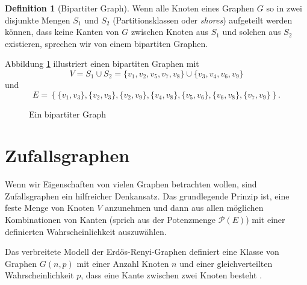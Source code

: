 \documentclass[11pt]{scrreprt} %
\theoremstyle{definition}
\newtheorem{definition}{Definition}
\begin{document}
\begin{definition}[Bipartiter Graph]
Wenn alle Knoten eines Graphen $G$ so in zwei disjunkte Mengen $S_1$ und $S_2$ (Partitionsklassen oder {\sl shores}) aufgeteilt werden können, dass keine Kanten von $G$ zwischen Knoten aus $S_1$ und solchen aus $S_2$ existieren, sprechen wir von einem bipartiten Graphen.
\end{definition}

Abbildung \ref{bipartGraph} illustriert einen bipartiten Graphen mit
\[
	V = S_1 \cup S_2 = \{v_1,v_2,v_5,v_7,v_8\} \cup \{ v_3,v_4,v_6,v_9 \}
\]
und
\[
	E = \left\{  \{v_1,v_3\}, \{v_2,v_3\}, \{v_2,v_9\}, \{v_4,v_8\}, \{v_5,v_6\}, \{ v_6,v_8 \}, \{ v_7,v_9 \}  \right\}.
\]

\begin{figure}
\caption{Ein bipartiter Graph}
\label{bipartGraph}
\begin{center}


\end{center}
\end{figure}

\section{Zufallsgraphen}

Wenn wir Eigenschaften von vielen Graphen betrachten wollen, sind Zufallsgraphen ein hilfreicher Denkansatz. Das grundlegende Prinzip ist, eine feste Menge von Knoten $V$ anzunehmen und dann aus allen möglichen Kombinationen von Kanten (sprich aus der Potenzmenge $\mathcal{P}(E)$) mit einer definierten Wahrscheinlichkeit auszuwählen.

\bigskip
Das verbreitete Modell der Erdös-Renyi-Graphen definiert eine Klasse von Graphen $G(n, p)$ mit einer Anzahl Knoten $n$ und einer gleichverteilten Wahrscheinlichkeit $p$, dass eine Kante zwischen zwei Knoten besteht \cite{erdos}.
\end{document}
